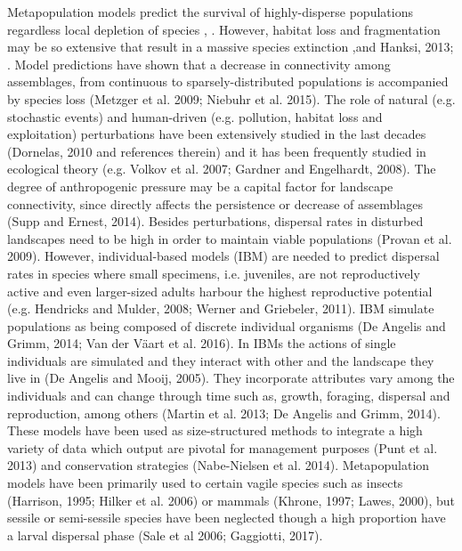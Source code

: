\documentclass[12pt]{article}
\begin{document}
\begin{flushleft}
Metapopulation models predict the survival of highly-disperse populations regardless local depletion of species \cite{hanski1999habitat}, \cite{akccakaya2007role}. However, habitat loss and fragmentation may be so extensive that result in a massive species extinction \cite{montoya2008habitat},\citeRybicki and Hanksi, 2013; \cite{haddad2015habitat}. Model predictions have shown that a decrease in connectivity among assemblages, from continuous to sparsely-distributed populations is accompanied by species loss (Metzger et al. 2009; Niebuhr et al. 2015). The role of natural (e.g. stochastic events) and human-driven (e.g. pollution, habitat loss and exploitation) perturbations have been extensively studied in the last decades (Dornelas, 2010 and references therein) and it has been frequently studied in ecological theory (e.g. Volkov et al. 2007; Gardner and Engelhardt, 2008). The degree of anthropogenic pressure may be a capital factor for landscape connectivity, since directly affects the persistence or decrease of assemblages (Supp and Ernest, 2014). Besides perturbations, dispersal rates in disturbed landscapes need to be high in order to maintain viable populations (Provan et al. 2009). However, individual-based models (IBM) are needed to predict dispersal rates in species where small specimens, i.e. juveniles, are not reproductively active and even larger-sized adults harbour the highest reproductive potential (e.g. Hendricks and Mulder, 2008; Werner and Griebeler, 2011). 
IBM simulate populations as being composed of discrete individual organisms (De Angelis and Grimm, 2014; Van der Väart et al. 2016). In IBMs the actions of single individuals are simulated and they interact with other and the landscape they live in (De Angelis and Mooij, 2005). They incorporate attributes vary among the individuals and can change through time such as, growth, foraging, dispersal and reproduction, among others (Martin et al. 2013; De Angelis and Grimm, 2014). These models have been used as size-structured methods to integrate a high variety of data which output are pivotal for management purposes (Punt et al. 2013) and conservation strategies (Nabe-Nielsen et al. 2014). Metapopulation models have been primarily used to certain vagile species such as insects (Harrison, 1995; Hilker et al. 2006) or mammals (Khrone, 1997; Lawes, 2000), but sessile or semi-sessile species have been neglected though a high proportion have a larval dispersal phase (Sale et al 2006; Gaggiotti, 2017).




\end{flushleft}
\end{document}
